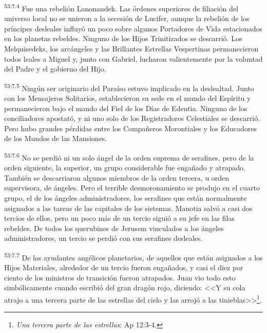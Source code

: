 \par
\textsuperscript{53:7.4} Fue una rebelión Lanonandek. Las órdenes superiores de filiación del universo local no se unieron a la secesión de Lucifer, aunque la rebelión de los príncipes desleales influyó un poco sobre algunos Portadores de Vida estacionados en los planetas rebeldes. Ninguno de los Hijos Trinitizados se descarrió. Los Melquisedeks, los arcángeles y las Brillantes Estrellas Vespertinas permanecieron todos leales a Miguel y, junto con Gabriel, lucharon valientemente por la voluntad del Padre y el gobierno del Hijo.

\par
\textsuperscript{53:7.5} Ningún ser originario del Paraíso estuvo implicado en la deslealtad. Junto con los Mensajeros Solitarios, establecieron su sede en el mundo del Espíritu y permanecieron bajo el mando del Fiel de los Días de Edentia. Ninguno de los conciliadores apostató, y ni uno solo de los Registradores Celestiales se descarrió. Pero hubo grandes pérdidas entre los Compañeros Morontiales y los Educadores de los Mundos de las Mansiones.

\par
\textsuperscript{53:7.6} No se perdió ni un solo ángel de la orden suprema de serafines, pero de la orden siguiente, la superior, un grupo considerable fue engañado y atrapado. También se descarriaron algunos miembros de la orden tercera, u orden supervisora, de ángeles. Pero el terrible desmoronamiento se produjo en el cuarto grupo, el de los ángeles administradores, los serafines que están normalmente asignados a las tareas de las capitales de los sistemas. Manotia salvó a casi dos tercios de ellos, pero un poco más de un tercio siguió a su jefe en las filas rebeldes. De todos los querubines de Jerusem vinculados a los ángeles administradores, un tercio se perdió con sus serafines desleales.

\par
\textsuperscript{53:7.7} De los ayudantes angélicos planetarios, de aquellos que están asignados a los Hijos Materiales, alrededor de un tercio fueron engañados, y casi el diez por ciento de los ministros de transición fueron atrapados. Juan vio todo esto simbólicamente cuando escribió del gran dragón rojo, diciendo: <<Y su cola atrajo a una tercera parte de las estrellas del cielo y las arrojó a las tinieblas>>\footnote{\textit{Una tercera parte de las estrellas}: Ap 12:3-4.}.

